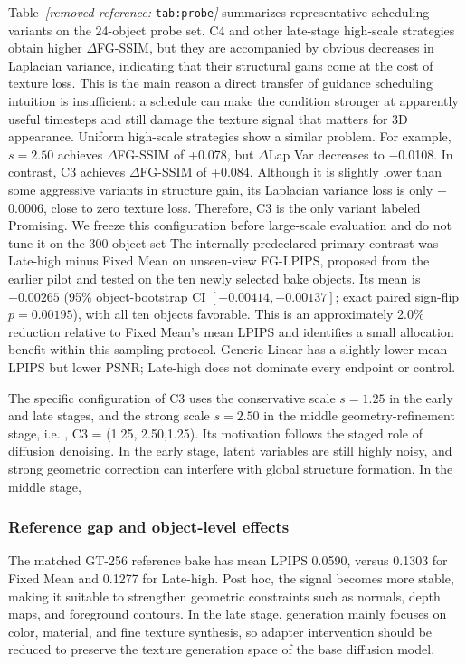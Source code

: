 \documentclass[times,twocolumn,final]{elsarticle}
\providecommand{\DIFadd}[1]{{\protect\color{blue} \sf #1}} %
\providecommand{\DIFdel}[1]{{\protect\color{red} \scriptsize #1}} %
\providecommand{\DIFaddbegin}{} %
\providecommand{\DIFaddend}{} %
\providecommand{\DIFdelbegin}{} %
\providecommand{\DIFdelend}{} %
\begin{document}
\DIFdelbegin \DIFdel{Table~\textit{[removed reference: }\texttt{tab:probe}\textit{]} summarizes representative scheduling variants on the 24-object probe set. C4 and other late-stage high-scale strategies obtain higher $\Delta$FG-SSIM, but they are accompanied by obvious decreases in Laplacian variance, indicating that their structural gains come at the cost of texture loss. This is the main reason a direct transfer of guidance scheduling intuition is insufficient: a schedule can make the condition stronger at apparently useful timesteps and still damage the texture signal that matters for 3D appearance. Uniform high-scale strategies show a similar problem. For example, $s = 2.50$ achieves $\Delta$FG-SSIM of +0.078, but $\Delta$Lap Var decreases to $-$0.0108. In contrast, C3 achieves $\Delta$FG-SSIM of +0.084. Although it is slightly lower than some aggressive variants in structure gain, its Laplacian variance loss is only $-$0.0006, close to zero texture loss. Therefore, C3 is the only variant labeled Promising. We freeze this configuration before large-scale evaluation and do not tune it on the 300-object set}\DIFdelend \DIFaddbegin \DIFadd{The internally predeclared primary contrast was Late-high minus Fixed Mean on unseen-view FG-LPIPS, proposed from the earlier pilot and tested on the ten newly selected bake objects. Its mean is $-0.00265$ (95\% object-bootstrap CI $[-0.00414,-0.00137]$; exact paired sign-flip $p=0.00195$), with all ten objects favorable. This is an approximately 2.0\% reduction relative to Fixed Mean's mean LPIPS and identifies a small allocation benefit within this sampling protocol. Generic Linear has a slightly lower mean LPIPS but lower PSNR; Late-high does not dominate every endpoint or control}\DIFaddend .

\DIFdelbegin \DIFdel{The specific configuration of C3 uses the conservative scale $s = 1.25$ in the early and late stages, and the strong scale $s = 2.50$ in the middle geometry-refinement stage, i.e. , C3 = (1.25, 2.50,1.25). Its motivation follows the staged role of diffusion denoising. In the early stage, latent variables are still highly noisy, and strong geometric correction can interfere with global structure formation. In the middle stage, }\DIFdelend \DIFaddbegin \subsubsection{Reference gap and object-level effects}
\DIFadd{The matched GT-256 reference bake has mean LPIPS 0.0590, versus 0.1303 for Fixed Mean and 0.1277 for Late-high. Post hoc, }\DIFaddend the \DIFdelbegin \DIFdel{signal becomes more stable, making it suitable to strengthen geometric constraints such as normals, depth maps, and foreground contours. In the late stage, generation mainly focuses on color, material, and fine texture synthesis, so adapter intervention should be reduced to preserve the texture generation space of the base diffusion model.
}%
\end{document}
